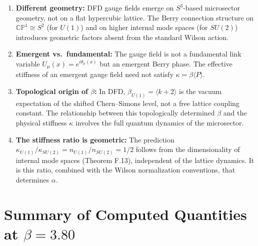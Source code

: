 \documentclass[12pt,a4paper]{article}
\newcommand{\bU}{\beta_{U(1)}}
\newcommand{\kU}{\kappa_{U(1)}}
\newcommand{\kS}{\kappa_{SU(2)}}
\begin{document}
\begin{enumerate}
\item \textbf{Different geometry:} DFD gauge fields emerge on $S^3$-based
  microsector geometry, not on a flat hypercubic lattice.  The Berry
  connection structure on $\mathbb{CP}^1 \cong S^2$ (for $U(1)$) and on
  higher internal mode spaces (for $SU(2)$) introduces geometric factors
  absent from the standard Wilson action.

\item \textbf{Emergent vs.\ fundamental:} The gauge field is not a
  fundamental link variable $U_\mu(x) = e^{i\theta_\mu(x)}$ but an
  emergent Berry phase.  The effective stiffness of an emergent gauge
  field need not satisfy $\kappa = \beta\langle P\rangle$.

\item \textbf{Topological origin of $\beta$:}  In DFD, $\bU = \langle k+2\rangle$
  is the vacuum expectation of the shifted Chern--Simons level, not a
  free lattice coupling constant.  The relationship between this
  topologically determined $\beta$ and the physical stiffness $\kappa$
  involves the full quantum dynamics of the microsector.

\item \textbf{The stiffness ratio is geometric:}  The prediction
  $\kU/\kS = n_{U(1)}/n_{SU(2)} = 1/2$ follows from the dimensionality
  of internal mode spaces (Theorem F.13), independent of the lattice
  dynamics.  It is this ratio, combined with the Wilson normalization
  conventions, that determines $\alpha$.
\end{enumerate}


\section{Summary of Computed Quantities at $\beta = 3.80$}
\end{document}
